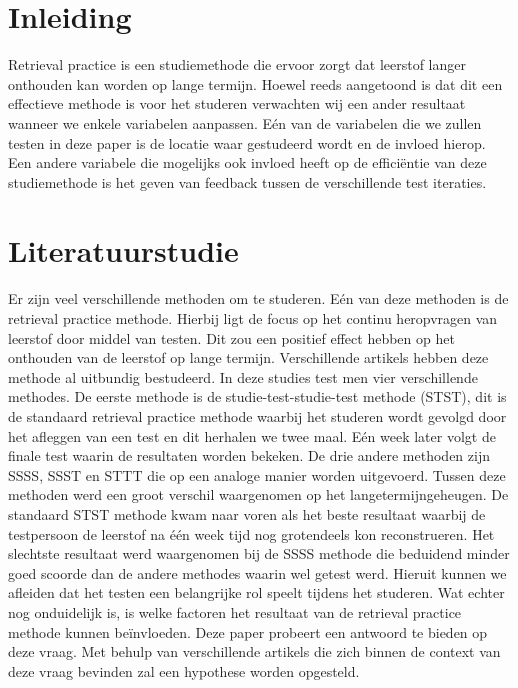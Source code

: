 \documentclass{hogent-article}
\affiliation{
	\textsuperscript{1} \href{mailto:olivier.troch.w2257@student.hogent.be}{Olivier.troch.w2257@student.hogent.be}
}
\affiliation{
	\textsuperscript{2} \href{mailto:daan.vanvooren.y1502@student.hogent.be}{daan.vanvooren.y1502@student.hogent.be}
}
\affiliation{
	\textsuperscript{3}
	\href{mailto:robbie.verdurme.y9234@student.hogent.be}{robbie.verdurme.y9234@student.hogent.be}
}
\affiliation{
	\textsuperscript{4}
	\href{mailto;sebastien.wojtyla.y3274@student.hogent.be}{sebastien.wojtyla.y3274@student.hogent.be}
}
\begin{document}
	
	\flushbottom %
	\maketitle %
	\tableofcontents %
	\thispagestyle{empty} %
	
	
	\section{Inleiding}
	Retrieval practice is een studiemethode die ervoor zorgt dat leerstof langer onthouden kan worden op lange termijn. Hoewel reeds aangetoond is dat dit een effectieve methode is voor het studeren verwachten wij een ander resultaat wanneer we enkele variabelen aanpassen. Eén van de variabelen die we zullen testen in deze paper is de locatie waar gestudeerd wordt en de invloed hierop. 
	Een andere variabele die mogelijks ook invloed heeft op de efficiëntie van deze studiemethode is het geven van feedback tussen de verschillende test iteraties.
	
	\section{Literatuurstudie}
	Er zijn veel verschillende methoden om te studeren. Eén van deze methoden is de retrieval practice methode. Hierbij ligt de focus op het continu heropvragen van leerstof door middel van testen. Dit zou een positief effect hebben op het onthouden van de leerstof op lange termijn.
    Verschillende artikels \autocite{butler2010repeated, pyc2012test, karpicke2007repeated, karpicke2008critical} hebben deze methode al uitbundig bestudeerd. In deze studies test men vier verschillende methodes. De eerste methode is de studie-test-studie-test methode (STST), dit is de standaard retrieval practice methode waarbij het studeren wordt gevolgd door het afleggen van een test en dit herhalen we twee maal. Eén week later volgt de finale test waarin de resultaten worden bekeken. De drie andere methoden zijn SSSS, SSST en STTT die op een analoge manier worden uitgevoerd.
	Tussen deze methoden werd een groot verschil waargenomen op het langetermijngeheugen. De standaard STST methode kwam naar voren als het beste resultaat waarbij de testpersoon de leerstof na één week tijd nog grotendeels kon reconstrueren. Het slechtste resultaat werd waargenomen bij de SSSS methode die beduidend minder goed scoorde dan de andere methodes waarin wel getest werd. Hieruit kunnen we afleiden dat het testen een belangrijke rol speelt tijdens het studeren. Wat echter nog onduidelijk is, is welke factoren het resultaat van de retrieval practice methode kunnen beïnvloeden. Deze paper probeert een antwoord te bieden op deze vraag. Met behulp van verschillende artikels die zich binnen de context van deze vraag bevinden zal een hypothese worden opgesteld.
    
\end{document}
